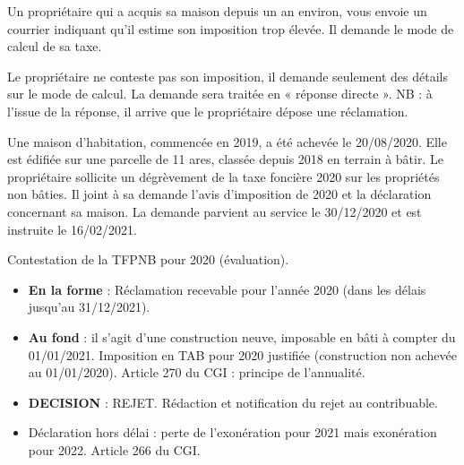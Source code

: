 \documentclass[answers, 12pt]{exam}
\begin{document}
	\begin{questions}
		
		\question Un propriétaire qui a acquis sa maison depuis un an environ, vous envoie un courrier indiquant qu'il estime son imposition trop élevée. Il demande le mode de calcul de sa taxe.
		\begin{solution}
			Le propriétaire ne conteste pas son imposition, il demande seulement des détails sur le mode de calcul. La demande sera traitée en « réponse directe ». 
			NB : à l'issue de la réponse, il arrive que le propriétaire dépose une réclamation.
		\end{solution}
		
		\question Une maison d'habitation, commencée en 2019, a été achevée le 20/08/2020. Elle est édifiée sur une parcelle de 11 ares, classée depuis 2018 en terrain à bâtir. Le propriétaire sollicite un dégrèvement de la taxe foncière 2020 sur les propriétés non bâties. Il joint à sa demande l'avis d'imposition de 2020 et la déclaration concernant sa maison. La demande parvient au service le 30/12/2020 et est instruite le 16/02/2021.
		\begin{solution}
			Contestation de la TFPNB pour 2020 (évaluation).
			\begin{itemize}
				\item \textbf{En la forme} : Réclamation recevable pour l'année 2020 (dans les délais jusqu'au 31/12/2021).
				\item \textbf{Au fond} : il s'agit d'une construction neuve, imposable en bâti à compter du 01/01/2021. Imposition en TAB pour 2020 justifiée (construction non achevée au 01/01/2020). Article 270 du CGI : principe de l'annualité.
				\item \textbf{DECISION} : REJET. Rédaction et notification du rejet au contribuable.
				\item Déclaration hors délai : perte de l'exonération pour 2021 mais exonération pour 2022. Article 266 du CGI.
			\end{itemize}
		\end{solution}
		

\end{questions}
\end{document}
